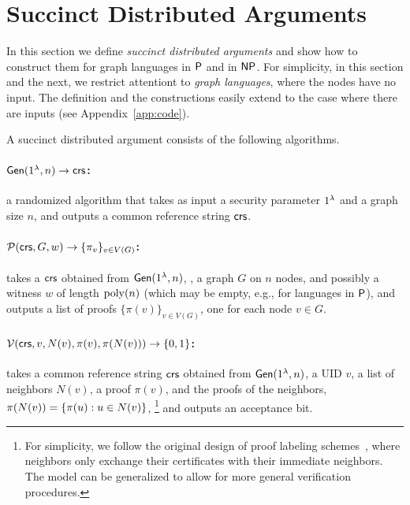 \section{Succinct Distributed Arguments}\label{sec:dargs}
In this section we define \emph{succinct distributed arguments} and show how to construct them for graph languages in
${\mathsf{P}}$ and in ${\mathsf{NP}}$.
For simplicity, in this section and the next,
we restrict attentiont to \emph{graph languages},
where the nodes have no input.
The definition and the constructions easily extend to the case where there are inputs
(see Appendix~\ref{app:code}).

A succinct distributed argument consists of the following algorithms.

\vspace{-1ex}
\paragraph{$\mathsf{Gen}(1^\lambda, n)\to \mathit{ \mathsf{crs} }$:} a randomized algorithm that takes as input a security parameter $1^\lambda$ and a graph size $n$, and outputs a common reference string $\mathit{ \mathsf{crs} }$.

\vspace{-1ex}
\paragraph{$\mathcal{P}(\mathit{ \mathsf{crs} }, G, w)\to \{\pi_v\}_{v\in V(G)}$:}
takes a $\mathit{ \mathsf{crs} }$ obtained from $\mathsf{Gen}(1^{\lambda}, n)$,
, %
a graph $G$ on $n$ nodes, and possibly a witness $w$ of length $\operatorname{poly}(n)$ (which may be empty, e.g., for languages in ${\mathsf{P}}$),
and outputs a list of proofs $\{\pi(v)\}_{v\in V(G)}$,
one for each node $v \in G$.

\vspace{-1ex}
\paragraph{$\mathcal{V}(\mathit{ \mathsf{crs} }, v, N(v), \pi(v), \pi(N(v)) )\to \{0,1\}$:}
takes a common reference string $\mathsf{crs}$ obtained from $\mathsf{Gen}(1^{\lambda}, n)$,
a UID $v$, a list of neighbors $N(v)$, a proof $\pi(v)$,
and the proofs of the neighbors, $\pi(N(v)) = \left \{{ \pi(u) : u \in N(v) } \right \}$,%
\footnote{For simplicity, we follow the original design of proof labeling schemes~\cite{korman2005proof},
where neighbors only exchange their certificates with their immediate neighbors.
The model can be generalized to allow for more general verification procedures.}
and outputs an acceptance bit.


